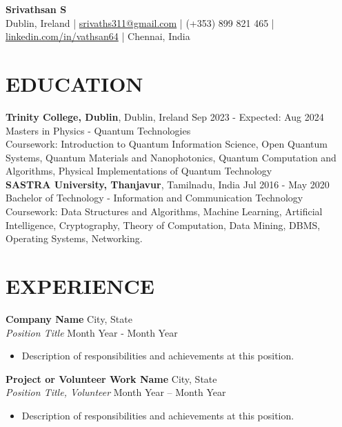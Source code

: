 \documentclass[a4paper,9pt]{extarticle}
\begin{document}
\pagestyle{empty}

\begin{center}
    \textbf{\Large Srivathsan S}\\[2pt] %
    Dublin, Ireland | \href{mailto:srivaths311@gmail.com}{srivaths311@gmail.com} | (+353) 899 821 465 | \href{https://www.linkedin.com/in/vathsan64}{linkedin.com/in/vathsan64} | Chennai,
    India %
\end{center}

\section*{EDUCATION}
\noindent
\textbf{Trinity College, Dublin}, Dublin, Ireland \hfill Sep 2023 - Expected: Aug 2024\\ %
Masters in Physics - Quantum Technologies\\
Coursework: Introduction to Quantum Information Science, Open Quantum Systems, Quantum Materials and Nanophotonics, Quantum Computation and
Algorithms, Physical Implementations of Quantum Technology\\%

\noindent
\textbf{SASTRA University, Thanjavur}, Tamilnadu, India \hfill Jul 2016 - May 2020\\ %
Bachelor of Technology - Information and Communication Technology\\
Coursework: Data Structures and Algorithms, Machine Learning, Artificial Intelligence, Cryptography, Theory of Computation, Data Mining,
DBMS, Operating Systems, Networking. %

\section*{EXPERIENCE}
\noindent
\textbf{Company Name} \hfill City, State\\ %
\textit{Position Title} \hfill Month Year - Month Year %
\begin{itemize}
    \item Description of responsibilities and achievements at this position. %
\end{itemize}

\noindent
\textbf{Project or Volunteer Work Name} \hfill City, State\\ %
\textit{Position Title, Volunteer} \hfill Month Year – Month Year %
\begin{itemize}
    \item Description of responsibilities and achievements at this position. %
\end{itemize}
\end{document}
